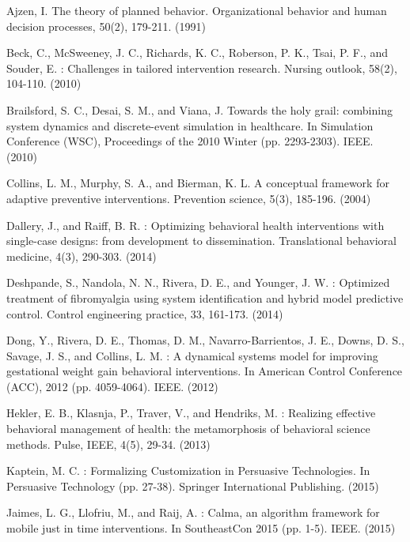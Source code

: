 \documentclass[runningheads,a4paper]{llncs}
\begin{document}
\begin{thebibliography}{4}

 Ajzen, I. The theory of planned behavior. Organizational behavior and human decision processes, 50(2), 179-211. (1991)

 Beck, C., McSweeney, J. C., Richards, K. C., Roberson, P. K., Tsai, P. F., and Souder, E. : Challenges in tailored intervention research. Nursing outlook, 58(2), 104-110. (2010)

 Brailsford, S. C., Desai, S. M., and Viana, J. Towards the holy grail: combining system dynamics and discrete-event simulation in healthcare. In Simulation Conference (WSC), Proceedings of the 2010 Winter (pp. 2293-2303). IEEE. (2010)

 Collins, L. M., Murphy, S. A., and Bierman, K. L. A conceptual framework for adaptive preventive interventions. Prevention science, 5(3), 185-196. (2004)

 Dallery, J., and Raiff, B. R. : Optimizing behavioral health interventions with single-case designs: from development to dissemination. Translational behavioral medicine, 4(3), 290-303. (2014)

 Deshpande, S., Nandola, N. N., Rivera, D. E., and Younger, J. W. : Optimized treatment of fibromyalgia using system identification and hybrid model predictive control. Control engineering practice, 33, 161-173. (2014)

 Dong, Y., Rivera, D. E., Thomas, D. M., Navarro-Barrientos, J. E., Downs, D. S., Savage, J. S., and Collins, L. M. : A dynamical systems model for improving gestational weight gain behavioral interventions. In American Control Conference (ACC), 2012 (pp. 4059-4064). IEEE. (2012)

 Hekler, E. B., Klasnja, P., Traver, V., and Hendriks, M. : Realizing effective behavioral management of health: the metamorphosis of behavioral science methods. Pulse, IEEE, 4(5), 29-34. (2013)

 Kaptein, M. C. : Formalizing Customization in Persuasive Technologies. In Persuasive Technology (pp. 27-38). Springer International Publishing. (2015)

 Jaimes, L. G., Llofriu, M., and Raij, A. : Calma, an algorithm framework for mobile just in time interventions. In SoutheastCon 2015 (pp. 1-5). IEEE. (2015)


\end{thebibliography}
\end{document}
